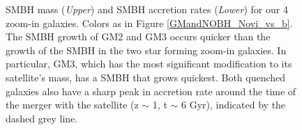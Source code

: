 \documentclass[]{emulateapj}
\begin{document}
\begin{figure}[h!]
\centerline{}
\centerline{} 
\caption[]{SMBH mass (\textit{Upper}) and SMBH accretion rates (\textit{Lower}) for our 4 zoom-in galaxies. Colors as in Figure \ref{GMandNOBH_Novi_vs_b}. The SMBH growth of GM2 and GM3 occurs quicker than the growth of the SMBH in the two star forming zoom-in galaxies. In particular, GM3, which has the most significant modification to its satellite's mass, has a SMBH that grows quickest. Both quenched galaxies also have a sharp peak in accretion rate around the time of the merger with the satellite (z $\sim$ 1, t $\sim$ 6 Gyr), indicated by the dashed grey line.}
\label{BHinfo}
\end{figure}
\end{document}
